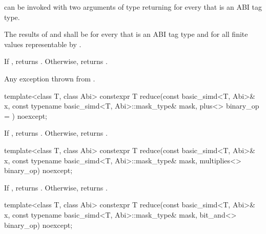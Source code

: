 \begin{itemdescr}
  \pnum\mandates
   can be invoked with two arguments of type  returning  for every  that is an ABI tag type.

  \pnum\expects
  The results of  and  shall be  for every  that is an ABI tag type and for all finite values  representable by .

  \pnum\returns
  If , returns .
  Otherwise, returns  \forallmaskedi.

  \pnum\throws
  Any exception thrown from .
\end{itemdescr}

\begin{itemdecl}
template<class T, class Abi>
  constexpr T reduce(const basic_simd<T, Abi>& x, const typename basic_simd<T, Abi>::mask_type& mask,
                     plus<> binary_op = {}) noexcept;
\end{itemdecl}

\begin{itemdescr}
  \pnum\returns
  If , returns . Otherwise, returns  \forallmaskedi.
\end{itemdescr}

\begin{itemdecl}
template<class T, class Abi>
  constexpr T reduce(const basic_simd<T, Abi>& x, const typename basic_simd<T, Abi>::mask_type& mask,
                     multiplies<> binary_op) noexcept;
\end{itemdecl}

\begin{itemdescr}
  \pnum\returns
  If , returns . Otherwise, returns  \forallmaskedi.
\end{itemdescr}

\begin{itemdecl}
template<class T, class Abi>
  constexpr T reduce(const basic_simd<T, Abi>& x, const typename basic_simd<T, Abi>::mask_type& mask,
                     bit_and<> binary_op) noexcept;
\end{itemdecl}

